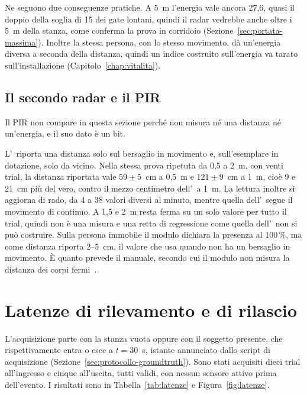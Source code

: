 Ne seguono due conseguenze pratiche. A 5~m l'energia vale ancora 27,6, quasi il doppio della soglia di 15 dei gate lontani, quindi il radar vedrebbe anche oltre i 5~m della stanza, come conferma la prova in corridoio (Sezione~\ref{sec:portata-massima}). Inoltre la stessa persona, con lo stesso movimento, dà un'energia diversa a seconda della distanza, quindi un indice costruito sull'energia va tarato sull'installazione (Capitolo~\ref{chap:vitalita}).

\subsection{Il secondo radar e il PIR}
\label{sec:distanza-ld2420}

Il PIR non compare in questa sezione perché non misura né una distanza né un'energia, e il suo dato è un bit.

L'\ldc\ riporta una distanza solo sul bersaglio in movimento e, sull'esemplare in dotazione, solo da vicino. Nella stessa prova ripetuta da 0,5 a 2~m, con venti trial, la distanza riportata vale $59 \pm 5$~cm a 0,5~m e $121 \pm 9$~cm a 1~m, cioè 9 e 21~cm più del vero, contro il mezzo centimetro dell'\ldb\ a 1~m. La lettura inoltre si aggiorna di rado, da 4 a 38 valori diversi al minuto, mentre quella dell'\ldb\ segue il movimento di continuo. A 1,5 e 2~m resta ferma su un solo valore per tutto il trial, quindi non è una misura e una retta di regressione come quella dell'\ldb\ non si può costruire. Sulla persona immobile il modulo dichiara la presenza al 100\,\%, ma come distanza riporta 2--5~cm, il valore che usa quando non ha un bersaglio in movimento. È quanto prevede il manuale, secondo cui il modulo non misura la distanza dei corpi fermi~\cite[§8]{hilinkManualLD2420}.

\section{Latenze di rilevamento e di rilascio}
\label{sec:latenza}
\label{sec:rilascio}

L'acquisizione parte con la stanza vuota oppure con il soggetto presente, che
rispettivamente entra o esce a $t = 30$~s, istante annunciato dallo script di
acquisizione (Sezione~\ref{sec:protocollo-groundtruth}). Sono stati acquisiti dieci
trial all'ingresso e cinque all'uscita, tutti validi, con nessun sensore attivo prima
dell'evento. I risultati sono in Tabella~\ref{tab:latenze} e Figura~\ref{fig:latenze}.

